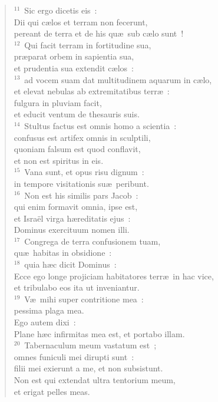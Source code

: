 \begin{verse}
${}^{11}$~Sic ergo dicetis eis~:\\ Dii qui c\ae los et terram non fecerunt,\\ pereant de terra et de his qu\ae\ sub c\ae lo sunt~!\\
${}^{12}$~Qui facit terram in fortitudine sua,\\ pr\ae parat orbem in sapientia sua,\\ et prudentia sua extendit c\ae los~:\\
${}^{13}$~ad vocem suam dat multitudinem aquarum in c\ae lo,\\ et elevat nebulas ab extremitatibus terr\ae~:\\ fulgura in pluviam facit,\\ et educit ventum de thesauris suis.\\
${}^{14}$~Stultus factus est omnis homo a scientia~:\\ confusus est artifex omnis in sculptili,\\ quoniam falsum est quod conflavit,\\ et non est spiritus in eis.\\
${}^{15}$~Vana sunt, et opus risu dignum~:\\ in tempore visitationis su\ae\ peribunt.\\
${}^{16}$~Non est his similis pars Jacob~:\\ qui enim formavit omnia, ipse est,\\ et Isra\"el virga h\ae reditatis ejus~:\\ Dominus exercituum nomen illi.\\
${}^{17}$~Congrega de terra confusionem tuam,\\ qu\ae\ habitas in obsidione~:\\
${}^{18}$~quia h\ae c dicit Dominus~:\\ Ecce ego longe projiciam habitatores terr\ae\ in hac vice,\\ et tribulabo eos ita ut inveniantur.\\
${}^{19}$~V\ae\ mihi super contritione mea~:\\ pessima plaga mea.\\ Ego autem dixi~:\\ Plane h\ae c infirmitas mea est, et portabo illam.\\
${}^{20}$~Tabernaculum meum vastatum est~;\\ omnes funiculi mei dirupti sunt~:\\ filii mei exierunt a me, et non subsistunt.\\ Non est qui extendat ultra tentorium meum,\\ et erigat pelles meas.\\

\end{verse}
